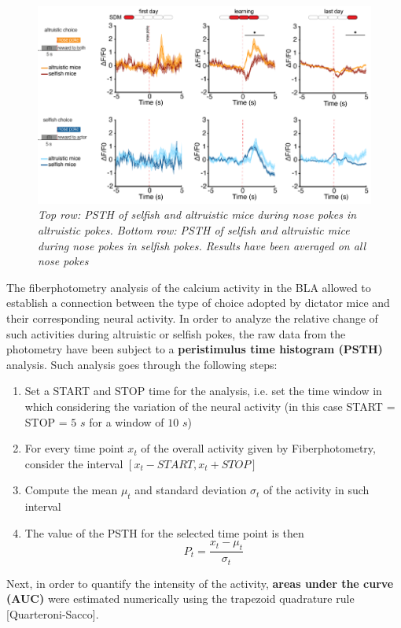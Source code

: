 \documentclass[12pt, a4paper]{article}
\begin{document}
\begin{figure}[H]
	\begin{center}
		\includegraphics[scale=0.77]{psth.png} 
	\end{center} 
	\caption{\textit{Top row: PSTH of selfish and altruistic mice during nose pokes in altruistic pokes. Bottom row:  PSTH of selfish and altruistic mice during nose pokes in selfish pokes. Results have been averaged on all nose pokes}}
	\label{psth}
\end{figure}

The fiberphotometry analysis of the calcium activity in the BLA allowed to establish a connection between the type of choice adopted by dictator mice and their corresponding neural activity. In order to analyze the relative change of such activities during altruistic or selfish pokes, the raw data from the photometry have been subject to a \textbf{peristimulus time histogram (PSTH)} analysis. Such analysis goes through the following steps:

\begin{enumerate}
	
	\item Set a START and STOP time for the analysis, i.e. set the time window in which considering the variation of the neural activity (in this case START = STOP = $5$ $s$ for a window of $10$ $s$)
	
	\item For every time point $x_t$ of the overall activity given by Fiberphotometry, consider the interval $[x_{t}-START , x_{t}+STOP]$
	
	\item Compute the mean $ \mu_t$ and standard deviation $\sigma_t$ of the activity in such interval
	
	\item The value of the PSTH for the selected time point is then
	$$ P_t = \frac{x_t - \mu_t}{\sigma_t}$$
\end{enumerate}
Next, in order to quantify the intensity of the activity, \textbf{areas under the curve (AUC)} were estimated numerically using the trapezoid quadrature rule [Quarteroni-Sacco].\\
\end{document}

